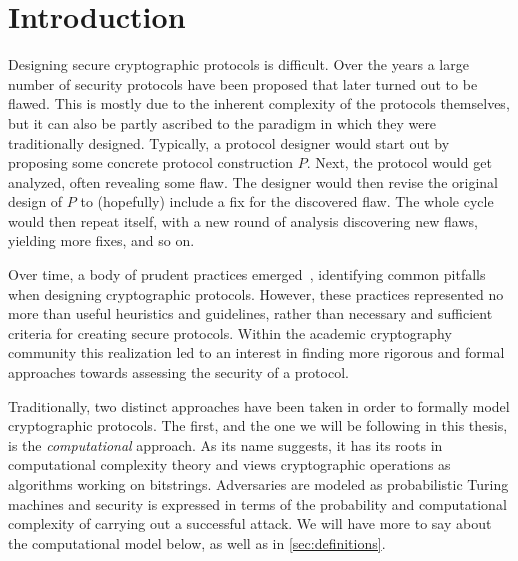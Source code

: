 \chapter{Introduction}\label{sec:intro}


\begingroup
\hypersetup{linkcolor=black}
\minitoc
\endgroup


\vspace{1ex}

Designing secure cryptographic protocols is difficult.
Over the years a large number of security protocols have been proposed that later turned out to be flawed. 
This is mostly due to the inherent complexity of the protocols themselves,
but it can also be partly ascribed to the  paradigm in which they were traditionally designed.
Typically,
a protocol designer would start out by proposing some concrete protocol construction $P$.
Next,
the protocol would get analyzed,
often revealing some flaw.
The designer would then revise the original design of $P$ to (hopefully) include a fix for the discovered flaw.
The whole cycle would then repeat itself,
with a new round of analysis discovering new flaws,
yielding more fixes,
and so on.    


Over time,
a body of prudent practices emerged~\cite{AbadiN:1996:prudent_engineering},
identifying common pitfalls when designing cryptographic protocols. 
However,
these practices represented no more than useful heuristics and guidelines,
rather than necessary and sufficient criteria for creating secure protocols.
Within the academic cryptography community this realization led to an interest in finding more rigorous and formal approaches towards assessing the security of a protocol.  

Traditionally,
two distinct approaches have been taken in order to formally model cryptographic protocols.
The first,
and the one we will be following in this thesis,
is the \emph{computational} approach.
As its name suggests,
it has its roots in computational complexity theory and views cryptographic operations as algorithms working on bitstrings.
Adversaries are modeled as probabilistic Turing machines and security is expressed in terms of the probability and computational complexity of carrying out a successful attack.
We will have more to say about the computational model below,
as well as in \cref{sec:definitions}.


